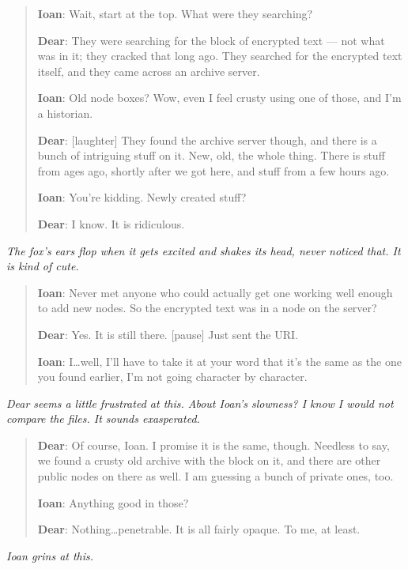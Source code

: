 \begin{quote}
\textbf{Ioan}: Wait, start at the top. What were they searching?

\textbf{Dear}: They were searching for the block of encrypted text — not what was in it; they cracked that long ago. They searched for the encrypted text itself, and they came across an archive server.

\textbf{Ioan}: Old node boxes? Wow, even I feel crusty using one of those, and I'm a historian.

\textbf{Dear}: {[}laughter{]} They found the archive server though, and there is a bunch of intriguing stuff on it. New, old, the whole thing. There is stuff from ages ago, shortly after we got here, and stuff from a few hours ago.

\textbf{Ioan}: You're kidding. Newly created stuff?

\textbf{Dear}: I know. It is ridiculous.
\end{quote}

\emph{The fox's ears flop when it gets excited and shakes its head, never noticed that. It is kind of cute.}

\begin{quote}
\textbf{Ioan}: Never met anyone who could actually get one working well enough to add new nodes. So the encrypted text was in a node on the server?

\textbf{Dear}: Yes. It is still there. {[}pause{]} Just sent the URI.

\textbf{Ioan}: I\ldots{}well, I'll have to take it at your word that it's the same as the one you found earlier, I'm not going character by character.
\end{quote}

\emph{Dear seems a little frustrated at this. About Ioan's slowness? I know I would not compare the files. It sounds exasperated.}

\begin{quote}
\textbf{Dear}: Of course, Ioan. I promise it is the same, though. Needless to say, we found a crusty old archive with the block on it, and there are other public nodes on there as well. I am guessing a bunch of private ones, too.

\textbf{Ioan}: Anything good in those?

\textbf{Dear}: Nothing\ldots{}penetrable. It is all fairly opaque. To me, at least.
\end{quote}

\emph{Ioan grins at this.}

